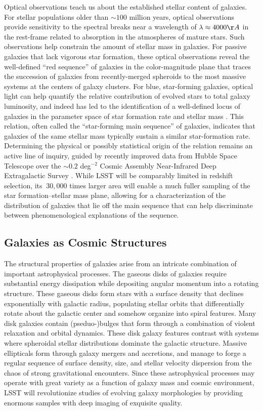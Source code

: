 Optical observations teach us about
the established stellar content of galaxies.  
For stellar populations older than $\sim100$ million
years, optical observations provide 
sensitivity to the spectral breaks near a
wavelength of $\lambda\approx4000\AA$ in the 
rest-frame related to absorption in the
atmospheres of mature stars. 
Such observations help constrain
the amount of stellar mass in galaxies. For
passive galaxies that lack vigorous star formation,
these optical observations reveal
the well-defined ``red sequence'' of
galaxies in the color-magnitude plane
that traces the succession of
galaxies from recently-merged spheroids
to the most massive systems at the
centers of galaxy clusters. For blue,
star-forming
galaxies, optical light can help
quantify the relative contribution of
evolved stars to total galaxy luminosity, 
and indeed has
led to the identification of a well-defined
locus of galaxies in the parameter space of
star formation rate and stellar mass 
\citep[e.g.,][]{noeske2007a}. This
relation, often called the ``star-forming
main sequence'' of galaxies, indicates that
galaxies of the same stellar mass typically
sustain a similar star-formation rate. 
Determining the
physical or possibly statistical 
origin of the relation remains an active
line of inquiry, guided by recently improved
data from Hubble Space Telescope over the
$\sim0.2$ deg$^{-2}$ Cosmic Assembly Near-Infrared
Deep Extragalactic Survey 
\citep{grogin2011a,koekemoer2011a}. While 
LSST will be comparably limited in redshift 
selection, its $~30,000$ times larger area
will enable a much fuller sampling of the
star formation--stellar mass plane, allowing
for a characterization of the distribution
of galaxies that lie off the main sequence
that can help discriminate between phenomenological
explanations of the sequence.

\subsection{Galaxies as Cosmic Structures}
\label{sec:sci:gal:bkgnd:structures}

The structural properties of galaxies arise from
an intricate combination of important astrophysical
processes. The gaseous disks of galaxies require
substantial energy dissipation while depositing
angular momentum into a rotating structure. These
gaseous disks form stars with a
surface density that declines exponentially with
galactic radius, populating stellar orbits that
differentially rotate about the galactic center and
somehow organize into spiral features.
Many disk galaxies contain (pseduo-)bulges that form through
a combination of violent relaxation and orbital dynamics.
These disk galaxy features contrast with systems where
spheroidal stellar distributions dominate the galactic
structure. Massive ellipticals form through galaxy
mergers and accretions, and manage to forge a regular
sequence of surface density, size, and stellar velocity
dispersion from the chaos of strong gravitational
encounters. Since these astrophysical
processes may operate with great
variety as a function of galaxy mass and
cosmic environment, LSST will revolutionize studies
of evolving galaxy morphologies by providing enormous
samples with deep imaging of exquisite quality.

